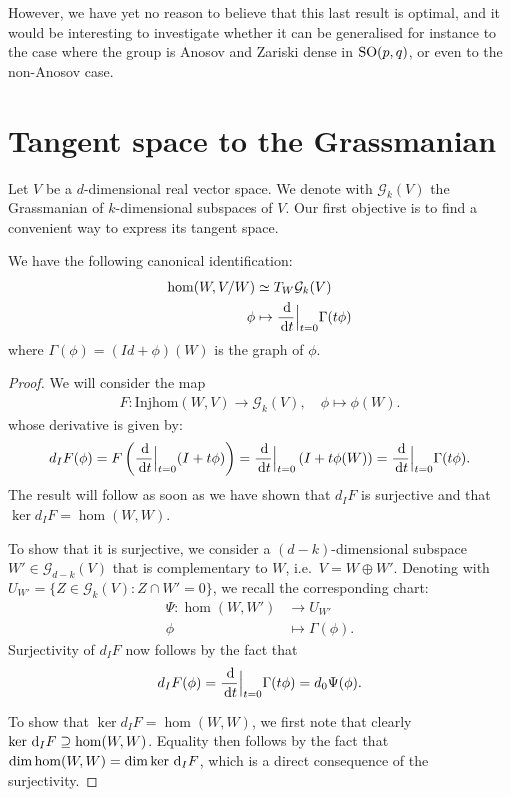 \documentclass{report}
\begin{document}
However, we have yet no reason to believe that this last result is optimal, and it would be interesting to investigate whether it can be generalised for instance to the case where the group is Anosov and Zariski dense in $\operatorname{{\mathrm{SO}}}(p,q)$, or even to the non-Anosov case.
\appendix
\chapter{Tangent space to the Grassmanian}
Let $V$ be a $d$-dimensional real vector space. 
We denote with $\mathcal G_{k}(V)$ the Grassmanian of $k$-dimensional subspaces of $V$.
Our first objective is to find a convenient way to express its tangent space.
\begin{proposition}
We have the following canonical identification:
\begin{align*}
    \hom(W, V/W) &\simeq T_W \mathcal G_{k}(V)\\
    \phi &\mapsto \frac{\,\mathrm{d}}{\,\mathrm{d} t} \Big|_{t=0} \Gamma(t \phi)
\end{align*}
where $\Gamma(\phi) = (Id+\phi)(W)$ is the graph of $\phi$.
\end{proposition}
\begin{proof}
    We will consider the map
    \begin{align*}
        F: \mathrm{Injhom}(W, V) \to \mathcal G_{k}(V), \quad \phi \mapsto \phi(W).
    \end{align*}
    whose derivative is given by:
    \begin{align*}
        d_I F (\phi) = F \left(\frac{\,\mathrm{d}}{\,\mathrm{d} t} \Big|_{t=0} (I + t\phi)\right)
        = \frac{\,\mathrm{d}}{\,\mathrm{d} t} \Big|_{t=0}  \left( I + t\phi (W) \right)
        = \frac{\,\mathrm{d}}{\,\mathrm{d} t} \Big|_{t=0}  \Gamma(t \phi).
    \end{align*}
    The result will follow as soon as we have shown that $d_I F$ is surjective and that $\ker d_I F = \hom(W, W)$.
    
    To show that it is surjective, we consider a $(d-k)$-dimensional subspace $W' \in \mathcal G_{d-k}(V) $ that is complementary to $W$, i.e.\ $V = W \oplus W'$.
    Denoting with $U_{W'} = \{ Z \in \mathcal G_k (V): Z \cap W' = 0 \}$, we recall the corresponding chart:
    \begin{align*}
        \Psi: \hom(W, W') &\to U_{W'}\\
        \phi &\mapsto \Gamma(\phi).
    \end{align*}
    Surjectivity of $d_I F$ now follows by the fact that
    \[
        d_I F(\phi) = \frac{\,\mathrm{d}}{\,\mathrm{d} t} \Big|_{t=0} \Gamma(t \phi) = d_0 \Psi(\phi).
    \]

    To show that $\ker d_I F = \hom(W, W)$, we first note that clearly $\ker \,\mathrm{d}_I F \supseteq \hom(W, W)$.
    Equality then follows by the fact that $\dim \hom(W, W) = \dim \ker \,\mathrm{d}_I F$, which is a direct consequence of the surjectivity.
\end{proof}
\end{document}

